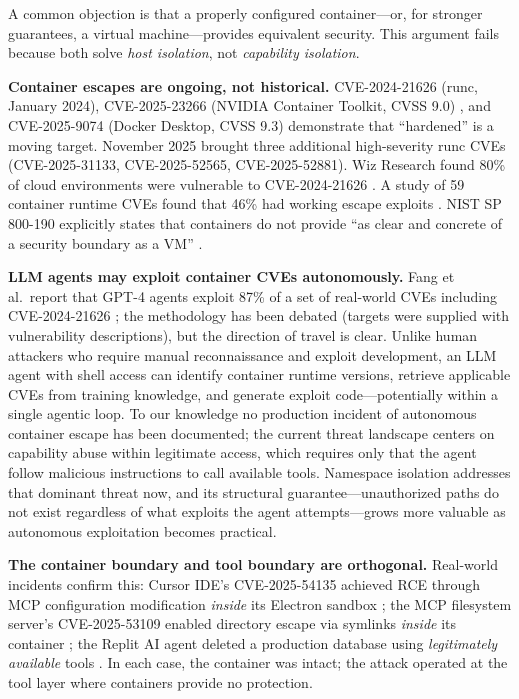 \documentclass[acmsmall,screen,review]{acmart}
\begin{document}
A common objection is that a properly configured container---or, for stronger guarantees, a virtual machine---provides equivalent security. This argument fails because both solve \textit{host isolation}, not \textit{capability isolation}.

\textbf{Container escapes are ongoing, not historical.} CVE-2024-21626 (runc, January 2024), CVE-2025-23266 (NVIDIA Container Toolkit, CVSS 9.0) \cite{nvdCVE202523266}, and CVE-2025-9074 (Docker Desktop, CVSS 9.3) \cite{nvdCVE20259074} demonstrate that ``hardened'' is a moving target. November 2025 brought three additional high-severity runc CVEs (CVE-2025-31133, CVE-2025-52565, CVE-2025-52881). Wiz Research found 80\% of cloud environments were vulnerable to CVE-2024-21626 \cite{wiz2024leakyvessels}. A study of 59 container runtime CVEs found that 46\% had working escape exploits \cite{lin2021container}. NIST SP 800-190 explicitly states that containers do not provide ``as clear and concrete of a security boundary as a VM'' \cite{nist800190}.

\textbf{LLM agents may exploit container CVEs autonomously.} Fang et al.\ report that GPT-4 agents exploit 87\% of a set of real-world CVEs including CVE-2024-21626 \cite{fang2024llmagents}; the methodology has been debated (targets were supplied with vulnerability descriptions), but the direction of travel is clear. Unlike human attackers who require manual reconnaissance and exploit development, an LLM agent with shell access can identify container runtime versions, retrieve applicable CVEs from training knowledge, and generate exploit code---potentially within a single agentic loop. To our knowledge no production incident of autonomous container escape has been documented; the current threat landscape centers on capability abuse within legitimate access, which requires only that the agent follow malicious instructions to call available tools. Namespace isolation addresses that dominant threat now, and its structural guarantee---unauthorized paths do not exist regardless of what exploits the agent attempts---grows more valuable as autonomous exploitation becomes practical.

\textbf{The container boundary and tool boundary are orthogonal.} Real-world incidents confirm this: Cursor IDE's CVE-2025-54135 achieved RCE through MCP configuration modification \textit{inside} its Electron sandbox \cite{cursor2025rce}; the MCP filesystem server's CVE-2025-53109 enabled directory escape via symlinks \textit{inside} its container \cite{nvdCVE202553109}; the Replit AI agent deleted a production database using \textit{legitimately available} tools \cite{replit2025incident}. In each case, the container was intact; the attack operated at the tool layer where containers provide no protection.
\end{document}
